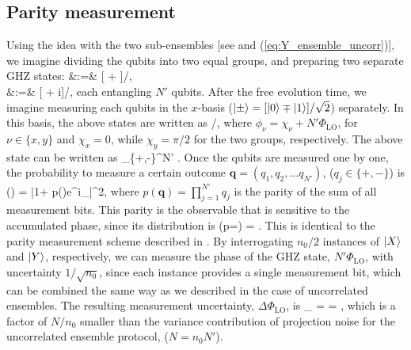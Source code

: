 \subsection{Parity measurement}
Using the idea with the two
sub-ensembles [see  and
(\ref{eq:Y_ensemble_uncorr})], we imagine dividing the qubits into two equal
groups, and preparing two separate GHZ states:
\bal
	 &:=& [ + ]/,\\
	 &:=& [ + i]/,
\eal
each entangling $N'$ qubits.
After the free evolution time, we imagine measuring each qubits in
the $x$-basis ($| \pm \rangle = [| 0 \rangle \mp | 1 \rangle]/\sqrt{2}$) separately. In this
basis, the above states are written as
\bel
	/,
\eel
where $\phi_\nu = \chi_\nu + N'\Phi_\mathrm{LO}$, for $\nu\in\{x,y\}$ and
$\chi_x = 0$, while $\chi_y = \pi/2$ for the two groups, respectively. The above
state can be written as
\bel
	\sum_{\in\{+,-\}^{\times N'}}
	\left[ \left(\prod_{j=1}^{N'} q_j \right) + e^{i\phi_\nu}\right]
	.
\eel
Once
the qubits are measured one by one, the probability to measure a certain outcome
$\mathbf{q} = (q_1, q_2, \dots q_{N'})$, ($q_j \in \{+,-\}$) is
\bel
	\PP() =  |1+ p()e^{i\phi_\nu}|^2,
\eel
where $p(\mathbf{q}) = \prod_{j=1}^{N'} q_j$ is the parity of the sum of all
measurement bits. This parity is the observable that is sensitive to the
accumulated phase, since its distribution is
\bel
	\PP(p=) = .
\eel
This is identical to the parity measurement scheme described in
\cite{Bollinger1996}.
By interrogating $n_0/2$ instances of $| X \rangle$ and $| Y \rangle$, respectively, we
can measure the phase of the GHZ state, $N' \Phi_\mathrm{LO}$, with uncertainty
$1/\sqrt{n_0}$, since each instance provides a single measurement bit, which can
be combined the same way as we described in the case of uncorrelated ensembles.
The resulting measurement uncertainty, $\Delta\Phi_\mathrm{LO}$, is
\bel
	\label{eq:projection_GHZ_1}
	_ =  =
	,
\eel
which is a factor of $N/n_0$ smaller than the
variance contribution of projection noise for the uncorrelated ensemble
protocol, ($N = n_0 N'$).

